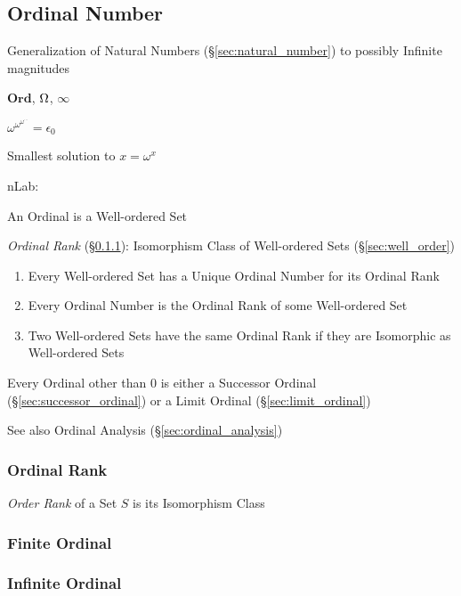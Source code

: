 \subsection{Ordinal Number}\label{sec:ordinal_number}

Generalization of Natural Numbers (\S\ref{sec:natural_number}) to
possibly Infinite magnitudes %

$\mathbf{Ord}$, $\Omega$, $\infty$

$\omega^{\omega^{\omega^{\cdots}}} = \epsilon_0$

Smallest solution to $x = \omega^x$

nLab:

An Ordinal is a Well-ordered Set

\emph{Ordinal Rank} (\S\ref{sec:ordinal_rank}): Isomorphism Class of
Well-ordered Sets (\S\ref{sec:well_order})

\begin{enumerate}
  \item Every Well-ordered Set has a Unique Ordinal Number for its
    Ordinal Rank
  \item Every Ordinal Number is the Ordinal Rank of some Well-ordered
    Set
  \item Two Well-ordered Sets have the same Ordinal Rank if they are
    Isomorphic as Well-ordered Sets
\end{enumerate}

Every Ordinal other than $0$ is either a Successor Ordinal
(\S\ref{sec:successor_ordinal}) or a Limit Ordinal
(\S\ref{sec:limit_ordinal})


\fist See also Ordinal Analysis (\S\ref{sec:ordinal_analysis})



\subsubsection{Ordinal Rank}\label{sec:ordinal_rank}

\emph{Order Rank} of a Set $S$ is its Isomorphism Class



\subsubsection{Finite Ordinal}\label{sec:finite_ordinal}

\subsubsection{Infinite Ordinal}\label{sec:infinite_ordinal}


